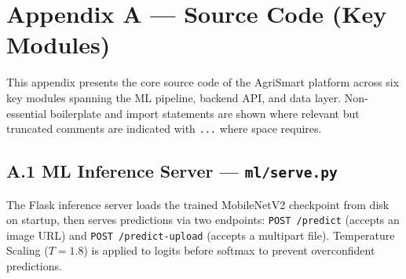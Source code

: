 \documentclass[12pt,a4paper]{report}
\begin{document}

\chapter*{Appendix A --- Source Code (Key Modules)}

This appendix presents the core source code of the AgriSmart platform across six key modules spanning the ML pipeline, backend API, and data layer. Non-essential boilerplate and import statements are shown where relevant but truncated comments are indicated with \texttt{...} where space requires.

\tableofcontents

\newpage

\section*{A.1 \quad ML Inference Server --- \texttt{ml/serve.py}}

The Flask inference server loads the trained MobileNetV2 checkpoint from disk on startup, then serves predictions via two endpoints: \texttt{POST /predict} (accepts an image URL) and \texttt{POST /predict-upload} (accepts a multipart file). Temperature Scaling ($T = 1.8$) is applied to logits before softmax to prevent overconfident predictions.
\end{document}
